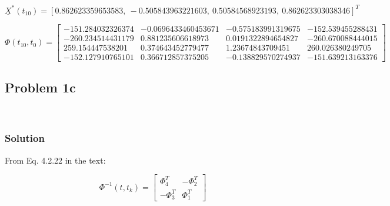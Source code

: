 \documentclass[conf]{new-aiaa}
\begin{document}
\begin{equation}
	\underline{X}^*(t_{10}) = [          0.862623359653583,~
	-0.505843963221603,~
	0.50584568923193,~
	0.862623303038346 ]^T
\end{equation}

\begin{equation}
	\Phi(t_{10}, t_0) = 
	\begin{bmatrix}
         -151.284032326374   &    -0.0696433460453671   &     -0.575183991319675   &      -152.539455288431 \\
		-260.234514431179    &     0.881235606618973    &    0.0191322894654827    &     -260.670088444015 \\
		259.154447538201     &    0.374643452779477     &     1.23674843709451     &     260.026380249705 \\
		-152.127910765101    &     0.366712857375205    &    -0.138829570274937    &     -151.639213163376
	\end{bmatrix}
\end{equation}


\newpage

\subsection*{Problem 1c} 

\begin{center}
	 \\
\end{center}


\subsubsection*{Solution} 

From Eq. 4.2.22 in the text\cite{born_statorbitdet}: 

\begin{equation}
	\Phi^{-1}(t, t_k) = 
	\begin{bmatrix}
		\Phi^T_4 & -\Phi^T_2 \\ 
		-\Phi^T_3 & \Phi^T_1
	\end{bmatrix}
\end{equation}
\end{document}
